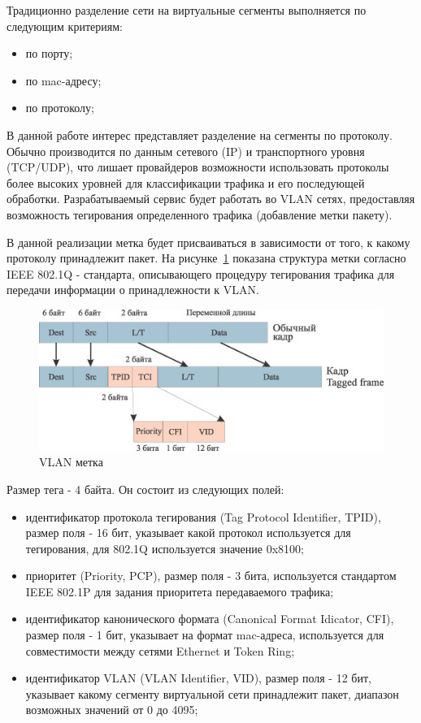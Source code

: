 Традиционно разделение сети на виртуальные сегменты выполняется по следующим критериям:
\begin{itemize}
\item по порту;
\item по mac-адресу;
\item по протоколу;
\end{itemize}

В данной работе интерес представляет разделение на сегменты по протоколу. Обычно производится по данным сетевого (IP) и транспортного уровня (TCP/UDP), что лишает провайдеров возможности использовать протоколы более высоких уровней для классификации трафика и его последующей обработки. Разрабатываемый сервис будет работать во VLAN сетях, предоставляя возможность тегирования определенного трафика (добавление метки пакету).

В данной реализации метка будет присваиваться в зависимости от того, к какому протоколу принадлежит пакет. На рисунке~\ref{pic:vlan_tag} показана структура метки согласно IEEE 802.1Q - стандарта, описывающего процедуру тегирования трафика для передачи информации о принадлежности к VLAN.
\begin{figure}
\centering
\includegraphics[scale=0.55]{pictures/vlan_tag}
\caption{VLAN метка}
\label{pic:vlan_tag}
\end{figure}

Размер тега - 4 байта. Он состоит из следующих полей:
\begin{itemize}
\item идентификатор протокола тегирования (Tag Protocol Identifier, TPID), размер поля - 16 бит, указывает какой протокол используется для тегирования, для 802.1Q используется значение 0x8100;
\item приоритет (Priority, PCP), размер поля - 3 бита, используется стандартом IEEE 802.1P для задания приоритета передаваемого трафика;
\item идентификатор канонического формата (Canonical Format Idicator, CFI), размер поля - 1 бит, указывает на формат mac-адреса, используется для совместимости между сетями Ethernet и Token Ring;
\item идентификатор VLAN (VLAN Identifier, VID), размер поля - 12 бит, указывает какому сегменту виртуальной сети принадлежит пакет, диапазон возможных значений от 0 до 4095;
\end{itemize}

